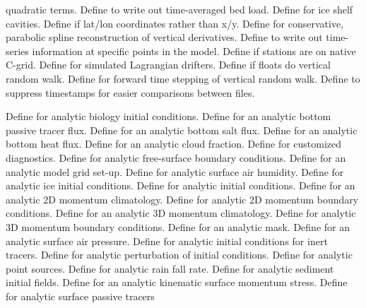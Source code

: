 \begin{klist}
\begin{klist}
  quadratic terms.
        Define to write out time-averaged
  bed load.
        Define for ice shelf cavities.
       Define if lat/lon coordinates rather than x/y.
         Define for conservative, parabolic spline
  reconstruction of vertical derivatives.
        Define to write out time-series
  information at specific points in the model.
        Define if stations are on native C-grid.
        Define for simulated Lagrangian drifters.
      Define if floats do vertical random walk.
     Define for forward time stepping of vertical random
  walk.
      Define to suppress timestamps for easier
    comparisons between files.
  \end{klist}
   \mbox{}
  \begin{klist}
     Define for analytic biology initial conditions.
      Define for an analytic bottom passive tracer flux.
      Define for an analytic bottom salt flux.
      Define for an analytic bottom heat flux.
       Define for an analytic cloud fraction.
        Define for customized diagnostics.
       Define for analytic free-surface boundary
  conditions.
        Define for an analytic model grid set-up.
     Define for analytic surface air humidity.
         Define for analytic ice initial conditions.
     Define for analytic initial conditions.
     Define for an analytic 2D momentum climatology.
       Define for analytic 2D momentum boundary
  conditions.
     Define for an analytic 3D momentum climatology.
       Define for analytic 3D momentum boundary
  conditions.
        Define for an analytic mask.
        Define for an analytic surface air pressure.
     Define for analytic initial conditions for
  inert tracers.
     Define for analytic perturbation of initial
  conditions.
     Define for analytic point sources.
        Define for analytic rain fall rate.
     Define for analytic sediment initial fields.
      Define for an analytic kinematic surface
  momentum stress.
      Define for analytic surface passive tracers

\end{klist}
\end{klist}
